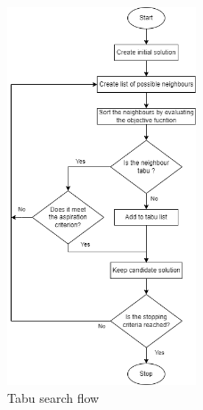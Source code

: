 \begin{figure}[h]
	\centering
	\includegraphics[width=0.5\textwidth]{images/tabu.drawio.png} 
	\caption{Tabu search flow}
	\label{fig:tabu-chart}
\end{figure}


 


